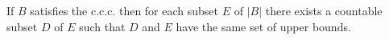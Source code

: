 If $B$ satisfies the c.c.c. then for each subset $E$ of $|B|$ there exists a countable subset $D$ of $E$ such that $D$ and $E$ have the same set of upper bounds.
